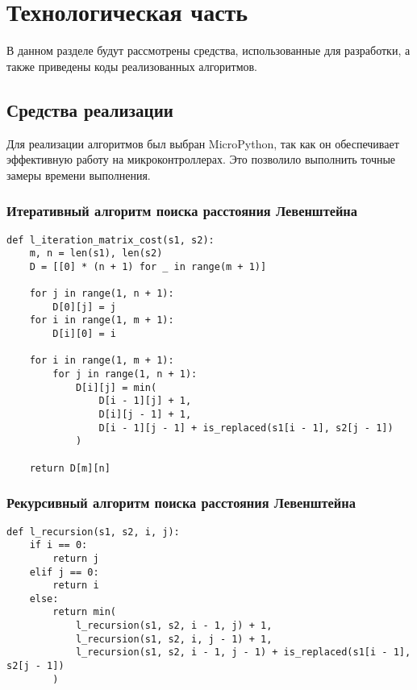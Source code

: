 \chapter{Технологическая часть}

В данном разделе будут рассмотрены средства, использованные для разработки, а также приведены коды реализованных алгоритмов.

\section{Средства реализации}

Для реализации алгоритмов был выбран MicroPython, так как он обеспечивает эффективную работу на микроконтроллерах. Это позволило выполнить точные замеры времени выполнения.

\subsection{Итеративный алгоритм поиска расстояния Левенштейна}

\begin{center}
\begin{lstlisting}[caption={Итеративный алгоритм поиска расстояния Левенштейна}, label={lst:l_iteration}]
def l_iteration_matrix_cost(s1, s2):
    m, n = len(s1), len(s2)
    D = [[0] * (n + 1) for _ in range(m + 1)]

    for j in range(1, n + 1):
        D[0][j] = j
    for i in range(1, m + 1):
        D[i][0] = i

    for i in range(1, m + 1):
        for j in range(1, n + 1):
            D[i][j] = min(
                D[i - 1][j] + 1,
                D[i][j - 1] + 1,
                D[i - 1][j - 1] + is_replaced(s1[i - 1], s2[j - 1])
            )

    return D[m][n]
\end{lstlisting}
\end{center}

\subsection{Рекурсивный алгоритм поиска расстояния Левенштейна}

\begin{center}
\begin{lstlisting}[caption={Рекурсивный алгоритм поиска расстояния Левенштейна}, label={lst:l_recursion}]
def l_recursion(s1, s2, i, j):
    if i == 0:
        return j
    elif j == 0:
        return i
    else:
        return min(
            l_recursion(s1, s2, i - 1, j) + 1,
            l_recursion(s1, s2, i, j - 1) + 1,
            l_recursion(s1, s2, i - 1, j - 1) + is_replaced(s1[i - 1], s2[j - 1])
        )
\end{lstlisting}
\end{center}

